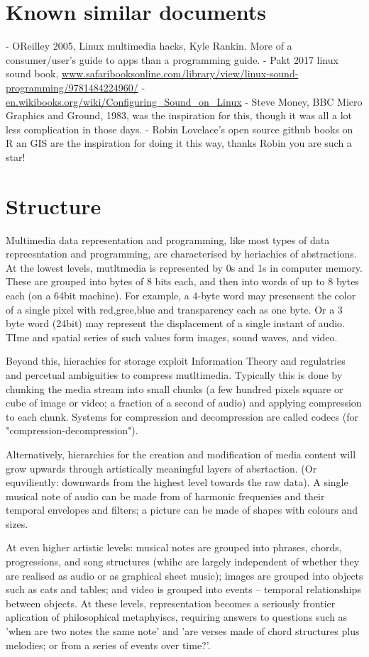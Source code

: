 \documentclass[oneside,english]{scrbook}
\begin{document}
\section{Known similar documents}
- OReilley 2005, Linux multimedia hacks, Kyle Rankin. More of a consumer/user's guide to apps than a programming guide.
- Pakt 2017 linux sound book, \url{www.safaribooksonline.com/library/view/linux-sound-programming/9781484224960/}
- \url{en.wikibooks.org/wiki/Configuring_Sound_on_Linux} 
- Steve Money, BBC Micro Graphics and Ground, 1983, was the inspiration for this, though it was all a lot less complication in those days.
- Robin Lovelace's open source github books on R an GIS are the inspiration for doing it this way, thanks Robin you are such a star!

\section{Structure}
Multimedia data representation and programming, like most types of data repreesntation and programming, are characterised by heriachies of abstractions. At the lowest levels, mutltmedia is represented by 0s and 1s in computer memory.  These are grouped into bytes of 8 bits each, and then into words of up to 8 bytes each (on a 64bit machine).  For example, a 4-byte word may presensent the color of a single pixel with red,gree,blue and transparency each as one byte.  Or a 3 byte word (24bit) may represent the displacement of a single instant of audio.  TIme and spatial series of such values form images, sound waves, and video.

Beyond this, hierachies for storage exploit Information Theory and regulatries and percetual ambiguities to compress mutltimedia.  Typically this is done by chunking the media stream into small chunks (a few hundred pixels square or cube of image or video; a fraction of a second of audio) and applying compression to each chunk.   Systems for compression and decompression are called codecs (for "compression-decompression"). 

Alternatively, hierarchies for the creation and modification of media content will grow upwards through artistically meaningful layers of absrtaction. (Or equviliently: downwards from the highest level towards the raw data).   A single musical note of audio can be made from of harmonic frequenies and their temporal envelopes and filters; a picture can be made of shapes with colours and sizes.  

At even higher artistic levels: musical notes are grouped into phrases, chords, progressions, and song structures (whihc are largely independent of whether they are realised as audio or as graphical sheet music); images are grouped into objects such as cats and tables; and video is grouped into events -- temporal relationships between objects.  At these levels, representation becomes a seriously frontier aplication of philosophical metaphyiscs, requiring answers to questions such as 'when are two notes the same note' and 'are verses made of chord structures plus melodies; or from a series of events over time?'. 
\end{document}
